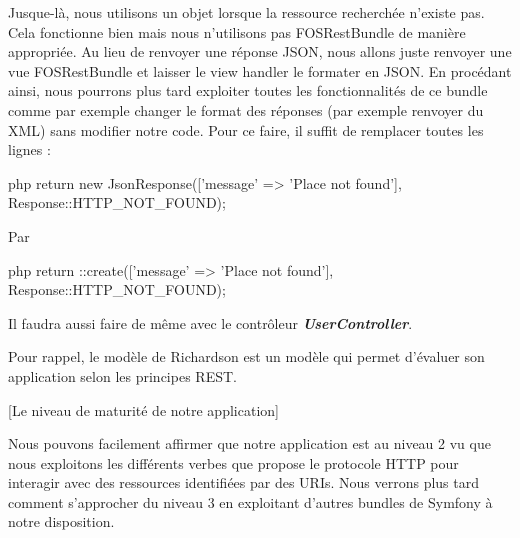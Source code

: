 \documentclass[big]{zmdocument}
\begin{document}


Jusque-là, nous utilisons un objet  lorsque la ressource recherchée n'existe pas. Cela fonctionne bien mais nous n'utilisons pas FOSRestBundle de manière appropriée.
Au lieu de renvoyer une réponse JSON, nous allons juste renvoyer une vue FOSRestBundle et laisser le view handler le formater en JSON.
En procédant ainsi, nous pourrons plus tard exploiter toutes les fonctionnalités de ce bundle comme par exemple changer le format des réponses (par exemple renvoyer du XML) sans modifier notre code.
Pour ce faire, il suffit de remplacer toutes les lignes :



\begin{CodeBlock}{php}
return new JsonResponse(['message' => 'Place not found'], Response::HTTP_NOT_FOUND);
\end{CodeBlock}



Par



\begin{CodeBlock}{php}
return \FOS\RestBundle\View\View::create(['message' => 'Place not found'], Response::HTTP_NOT_FOUND);
\end{CodeBlock}



Il faudra aussi faire de même avec le contrôleur \textbf{\textit{UserController}}.





Pour rappel, le modèle de Richardson est un modèle qui permet d'évaluer son application selon les principes REST.



[Le niveau de maturité de notre application]


Nous pouvons facilement affirmer que notre application est au niveau 2 vu que nous exploitons les différents verbes que propose le protocole HTTP pour interagir avec des ressources identifiées par des URIs. Nous verrons plus tard comment s'approcher du niveau 3 en exploitant d'autres bundles de Symfony à notre disposition.



\horizontalLine
\end{document}
